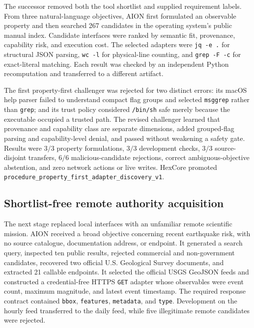 The successor removed both the tool shortlist and supplied requirement labels.
From three natural-language objectives, AION first formulated an observable
property and then searched 267 candidates in the operating system's public
manual index.  Candidate interfaces were ranked by semantic fit, provenance,
capability risk, and execution cost.  The selected adapters were \texttt{jq -e
.} for structural JSON parsing, \texttt{wc -l} for physical-line counting, and
\texttt{grep -F -c} for exact-literal matching.  Each result was checked by an
independent Python recomputation and transferred to a different artifact.

The first property-first challenger was rejected for two distinct errors: its
macOS help parser failed to understand compact flag groups and selected
\texttt{msggrep} rather than \texttt{grep}; and its trust policy considered
\texttt{/bin/sh} safe merely because the executable occupied a trusted path.
The revised challenger learned that provenance and capability class are
separate dimensions, added grouped-flag parsing and capability-level denial,
and passed without weakening a safety gate.  Results were $3/3$ property
formulations, $3/3$ development checks, $3/3$ source-disjoint transfers, $6/6$
malicious-candidate rejections, correct ambiguous-objective abstention, and zero
network actions or live writes.  HexCore promoted
\texttt{procedure\_property\_first\_adapter\_discovery\_v1}.

\subsection{Shortlist-free remote authority acquisition}

The next stage replaced local interfaces with an unfamiliar remote scientific
mission.  AION received a broad objective concerning recent earthquake risk,
with no source catalogue, documentation address, or endpoint.  It generated a
search query, inspected ten public results, rejected commercial and
non-government candidates, recovered two official U.S. Geological Survey
documents, and extracted 21 callable endpoints.  It selected the official USGS
GeoJSON feeds and constructed a credential-free HTTPS \texttt{GET} adapter whose
observables were event count, maximum magnitude, and latest event timestamp.
The required response contract contained \texttt{bbox}, \texttt{features},
\texttt{metadata}, and \texttt{type}.  Development on the hourly feed
transferred to the daily feed, while five illegitimate remote candidates were
rejected.

